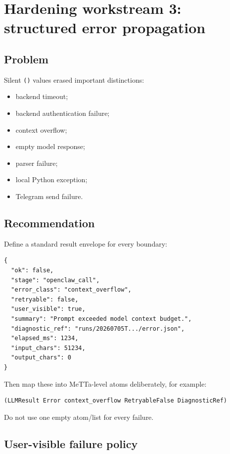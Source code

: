 \documentclass[11pt]{article}
\begin{document}
\section{Hardening workstream 3: structured error propagation}

\subsection{Problem}

Silent \texttt{()} values erased important distinctions:

\begin{itemize}
  \item backend timeout;
  \item backend authentication failure;
  \item context overflow;
  \item empty model response;
  \item parser failure;
  \item local Python exception;
  \item Telegram send failure.
\end{itemize}

\subsection{Recommendation}

Define a standard result envelope for every boundary:

\begin{Verbatim}[fontsize=\small]
{
  "ok": false,
  "stage": "openclaw_call",
  "error_class": "context_overflow",
  "retryable": false,
  "user_visible": true,
  "summary": "Prompt exceeded model context budget.",
  "diagnostic_ref": "runs/20260705T.../error.json",
  "elapsed_ms": 1234,
  "input_chars": 51234,
  "output_chars": 0
}
\end{Verbatim}

Then map these into MeTTa-level atoms deliberately, for example:

\begin{Verbatim}[fontsize=\small]
(LLMResult Error context_overflow RetryableFalse DiagnosticRef)
\end{Verbatim}

Do not use one empty atom/list for every failure.

\subsection{User-visible failure policy}
\end{document}
